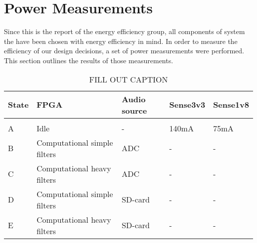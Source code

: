\section{Power Measurements}\label{power_measurements}

Since this is the report of the energy efficiency group, all components of
system the have been chosen with energy efficiency in mind. In order to measure
the efficiency of our design decisions, a set of power measurements were
performed. This section outlines the results of those measurements.

\begin{table}
    \begin{tabular}{lllll}
	State & FPGA                         & Audio source & Sense3v3 & Sense1v8 \\
	\hline \\
	A     & Idle                         & -            & 140mA    & 75mA \\
	B     & Computational simple filters & ADC          & -        & - \\
	C     & Computational heavy filters  & ADC          & -        & - \\
        D     & Computational simple filters & SD-card      & -        & - \\
        E     & Computational heavy filters  & SD-card      & -        & -
    \end{tabular}
    \label{tab:results/power-measurement}
    \caption{FILL OUT CAPTION}
\end{table}

